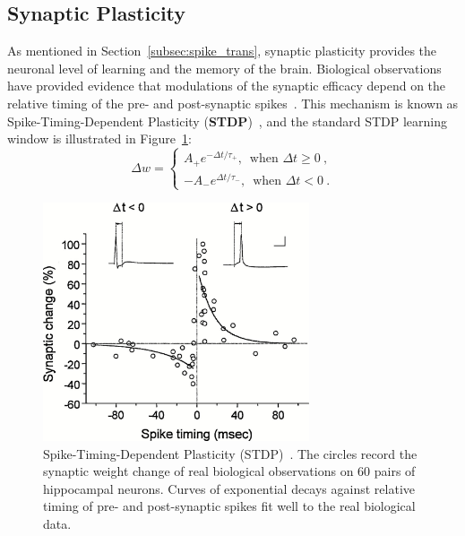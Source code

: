 \subsection{Synaptic Plasticity}
\label{subsec:STDP}
As mentioned in Section~\ref{subsec:spike_trans}, synaptic plasticity provides the neuronal level of learning and the memory of the brain.
Biological observations have provided evidence that modulations of the synaptic efficacy depend on the relative timing of the pre- and post-synaptic spikes~\citep{bi1998synaptic}.
This mechanism is known as Spike-Timing-Dependent Plasticity (\textbf{STDP})~\citep{song2000competitive}, and the standard STDP learning window is illustrated in Figure~\ref{Fig:STDP}:
\begin{equation}
\Delta w = \left\{
\begin{aligned}
A_+ e^{-\Delta t/\tau_+} \textrm{,~~when~} \Delta t \geq 0~, \\
{-A}_- e^{\Delta t/\tau_-} \textrm{,~~when~} \Delta t < 0~.
\end{aligned}
\right.
\label{equ:stdp}
\end{equation}

\begin{figure}[bt!]
	\centering
	\includegraphics[width=0.7\textwidth]{pics_snn/stdp.jpeg}
	\caption[Spike-Timing-Dependent Plasticity (STDP)~\citep{bi2001synaptic}.]{Spike-Timing-Dependent Plasticity (STDP)~\citep{bi2001synaptic}.
	The circles record the synaptic weight change of real biological observations on 60 pairs of hippocampal neurons.
	Curves of exponential decays against relative timing of pre- and post-synaptic spikes fit well to the real biological data.
	}
	\label{Fig:STDP}
\end{figure}

